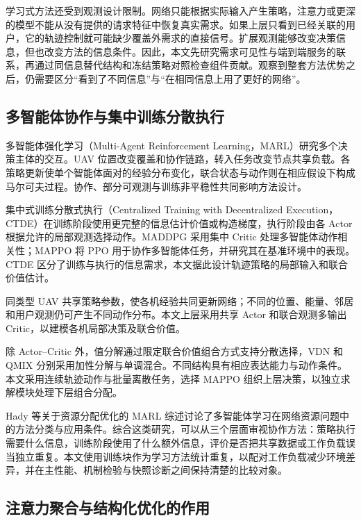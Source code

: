 学习式方法还受到观测设计限制。网络只能根据实际输入产生策略，注意力或更深的模型不能从没有提供的请求特征中恢复真实需求。如果上层只看到已经关联的用户，它的轨迹控制就可能缺少覆盖外需求的直接信号。扩展观测能够改变决策信息，但也改变方法的信息条件。因此，本文先研究需求可见性与端到端服务的联系，再通过同信息替代结构和冻结策略对照检查组件贡献。观察到整套方法优势之后，仍需要区分“看到了不同信息”与“在相同信息上用了更好的网络”。

\subsection{多智能体协作与集中训练分散执行}
\label{sec:ch1-marl-related}

多智能体强化学习（Multi-Agent Reinforcement Learning，MARL）研究多个决策主体的交互。UAV 位置改变覆盖和协作链路，转入任务改变节点共享负载。各策略更新使单个智能体面对的经验分布变化，联合状态与动作则在相应假设下构成马尔可夫过程。协作、部分可观测与训练非平稳性共同影响方法设计。

集中式训练分散式执行（Centralized Training with Decentralized Execution，CTDE）在训练阶段使用更完整的信息估计价值或构造梯度，执行阶段由各 Actor 根据允许的局部观测选择动作。MADDPG 采用集中 Critic 处理多智能体动作相关性\cite{lowe2017multi}；MAPPO 将 PPO 用于协作多智能体任务，并研究其在基准环境中的表现\cite{yu2022surprising}。CTDE 区分了训练与执行的信息需求，本文据此设计轨迹策略的局部输入和联合价值估计。

同类型 UAV 共享策略参数，使各机经验共同更新网络；不同的位置、能量、邻居和用户观测仍可产生不同动作分布。本文上层采用共享 Actor 和联合观测多输出 Critic，以建模各机局部决策及联合价值。

除 Actor--Critic 外，值分解通过限定联合价值组合方式支持分散选择，VDN 和 QMIX 分别采用加性分解与单调混合\cite{sunehag2018value,rashid2018qmix}。不同结构具有相应表达能力与动作条件。本文采用连续轨迹动作与批量离散任务，选择 MAPPO 组织上层决策，以独立求解模块处理下层组合分配。

Hady 等关于资源分配优化的 MARL 综述讨论了多智能体学习在网络资源问题中的方法分类与应用条件\cite{fan2021uav}。综合这类研究，可以从三个层面审视协作方法：策略执行需要什么信息，训练阶段使用了什么额外信息，评价是否把共享数据或工作负载误当独立重复。本文使用训练块作为学习方法统计重复，以配对工作负载减少环境差异，并在主性能、机制检验与快照诊断之间保持清楚的比较对象。

\subsection{注意力聚合与结构化优化的作用}
\label{sec:ch1-attention-related}

